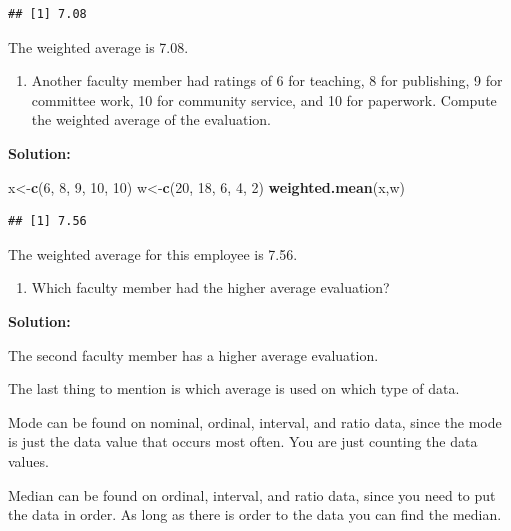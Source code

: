 \documentclass[]{book}
\newenvironment{Shaded}{\begin{snugshade}}{\end{snugshade}}
\newcommand{\DecValTok}[1]{\textcolor[rgb]{0.00,0.00,0.81}{#1}}
\newcommand{\KeywordTok}[1]{\textcolor[rgb]{0.13,0.29,0.53}{\textbf{#1}}}
\newcommand{\NormalTok}[1]{#1}
\providecommand{\tightlist}{%
  \setlength{\itemsep}{0pt}\setlength{\parskip}{0pt}}
\begin{document}
\begin{verbatim}
## [1] 7.08
\end{verbatim}

The weighted average is 7.08.

\begin{enumerate}
\def\labelenumi{\alph{enumi})}
\setcounter{enumi}{1}
\tightlist
\item
  Another faculty member had ratings of 6 for teaching, 8 for publishing, 9 for committee work, 10 for community service, and 10 for paperwork. Compute the weighted average of the evaluation.
\end{enumerate}

\textbf{Solution:}

\begin{Shaded}
\begin{Highlighting}[]
\NormalTok{x<-}\KeywordTok{c}\NormalTok{(}\DecValTok{6}\NormalTok{, }\DecValTok{8}\NormalTok{, }\DecValTok{9}\NormalTok{, }\DecValTok{10}\NormalTok{, }\DecValTok{10}\NormalTok{)}
\NormalTok{w<-}\KeywordTok{c}\NormalTok{(}\DecValTok{20}\NormalTok{, }\DecValTok{18}\NormalTok{, }\DecValTok{6}\NormalTok{, }\DecValTok{4}\NormalTok{, }\DecValTok{2}\NormalTok{)}
\KeywordTok{weighted.mean}\NormalTok{(x,w)}
\end{Highlighting}
\end{Shaded}

\begin{verbatim}
## [1] 7.56
\end{verbatim}

The weighted average for this employee is 7.56.

\begin{enumerate}
\def\labelenumi{\alph{enumi})}
\setcounter{enumi}{2}
\tightlist
\item
  Which faculty member had the higher average evaluation?
\end{enumerate}

\textbf{Solution:}

The second faculty member has a higher average evaluation.

The last thing to mention is which average is used on which type of
data.

Mode can be found on nominal, ordinal, interval, and ratio data, since the mode is just the data value that occurs most often. You are just counting the data values.

Median can be found on ordinal, interval, and ratio data, since you need to put the data in order. As long as there is order to the data you can find the median.
\end{document}
